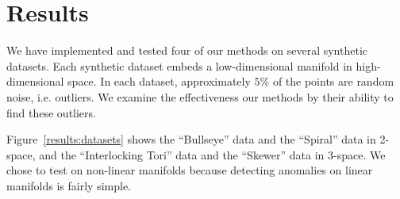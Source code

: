\section{Results}
\label{sec:results}

We have implemented and tested four of our methods on several synthetic datasets.
Each synthetic dataset embeds a low-dimensional manifold in high-dimensional space.
In each dataset, approximately $5\%$ of the points are random noise, i.e. outliers.
We examine the effectiveness our methods by their ability to find these outliers.

Figure~\ref{results:datasets} shows the ``Bullseye'' data and the ``Spiral'' data in 2-space, and the ``Interlocking Tori'' data and the ``Skewer'' data in 3-space.
We chose to test on non-linear manifolds because detecting anomalies on linear manifolds is fairly simple.

